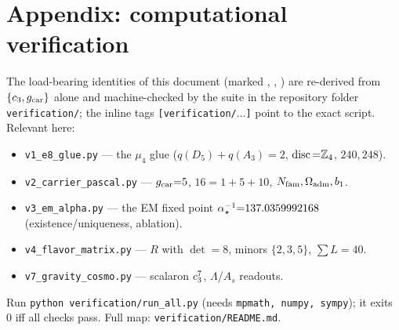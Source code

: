 

\section*{Appendix: computational verification}
The load-bearing identities of this document (marked \mE, \mE, \mE) are re-derived from
$\{c_3,g_{\mathrm{car}}\}$ alone and machine-checked by the suite in the repository folder
\texttt{verification/}; the inline tags \texttt{[verification/$\dots$]} point to the exact script.
Relevant here:
\begin{itemize}[leftmargin=1.4em,itemsep=1pt]
\item \texttt{v1\_e8\_glue.py} --- the $\mu_4$ glue ($q(D_5){+}q(A_3){=}2$, $\operatorname{disc}{=}\mathbb{Z}_4$, $240,248$).
\item \texttt{v2\_carrier\_pascal.py} --- $g_{\mathrm{car}}{=}5$, $16{=}1{+}5{+}10$, $N_{\mathrm{fam}},\Omega_{\mathrm{adm}},b_1$.
\item \texttt{v3\_em\_alpha.py} --- the EM fixed point $\alpha^{-1}_\star{=}137.0359992168$ (existence/uniqueness, ablation).
\item \texttt{v4\_flavor\_matrix.py} --- $R$ with $\det{=}8$, minors $\{2,3,5\}$, $\sum L{=}40$.
\item \texttt{v7\_gravity\_cosmo.py} --- scalaron $c_3^7$, $\Lambda$/$A_s$ readouts.
\end{itemize}
Run \texttt{python verification/run\_all.py} (needs \texttt{mpmath, numpy, sympy}); it exits $0$ iff all
checks pass. Full map: \texttt{verification/README.md}.





